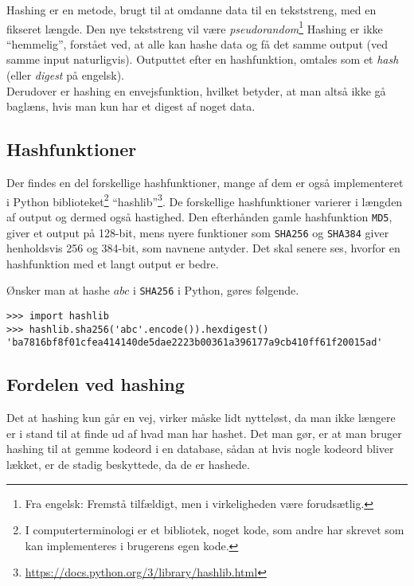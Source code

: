 Hashing er en metode, brugt til at omdanne data til en tekststreng, med en fikseret længde.
Den nye tekststreng vil være \emph{pseudorandom}\footnote{Fra engelsk: Fremstå tilfældigt, men i virkeligheden være forudsætlig.} %
Hashing er ikke ``hemmelig'', forstået ved, at alle kan hashe data og få det samme output (ved samme input naturligvis).
Outputtet efter en hashfunktion, omtales som et \emph{hash} (eller \emph{digest} på engelsk).
\\
Derudover er hashing en envejsfunktion, hvilket betyder, at man altså ikke gå baglæns, hvis man kun har et digest af noget data.\cite{algoritmer}


\subsection{Hashfunktioner}
Der findes en del forskellige hashfunktioner, mange af dem er også implementeret i Python biblioteket\footnote{I computerterminologi er et bibliotek, noget kode, som andre har skrevet som kan implementeres i brugerens egen kode.} ``hashlib''\footnote{\url{https://docs.python.org/3/library/hashlib.html}}.
De forskellige hashfunktioner varierer i længden af output og dermed også hastighed.
Den efterhånden gamle hashfunktion \texttt{MD5}, giver et output på 128-bit, mens nyere funktioner som \texttt{SHA256} og \texttt{SHA384} giver henholdsvis 256 og 384-bit, som navnene antyder.
Det skal senere ses, hvorfor en hashfunktion med et langt output er bedre.

Ønsker man at hashe \(abc\) i \texttt{SHA256} i Python, gøres følgende.
\begin{verbatim}
>>> import hashlib
>>> hashlib.sha256('abc'.encode()).hexdigest()
'ba7816bf8f01cfea414140de5dae2223b00361a396177a9cb410ff61f20015ad'
\end{verbatim}


\subsection{Fordelen ved hashing}
Det at hashing kun går en vej, virker måske lidt nytteløst, da man ikke længere er i stand til at finde ud af hvad man har hashet.
Det man gør, er at man bruger hashing til at gemme kodeord i en database, sådan at hvis nogle kodeord bliver lækket, er de stadig beskyttede, da de er hashede.\cite{version2}

